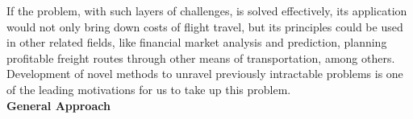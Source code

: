 \documentclass{article}[9pt]
\begin{document}
If the problem, with such layers of challenges, is solved effectively, its application would not only bring down costs of flight travel, but its principles could be used in other related fields, like financial market analysis and prediction, planning profitable freight routes through other means of transportation, among others. Development of novel methods to unravel previously intractable problems is one of the leading motivations for us to take up this problem.\\
[\baselineskip]
\noindent
\Large{\textbf{General Approach}}%
\end{document}
